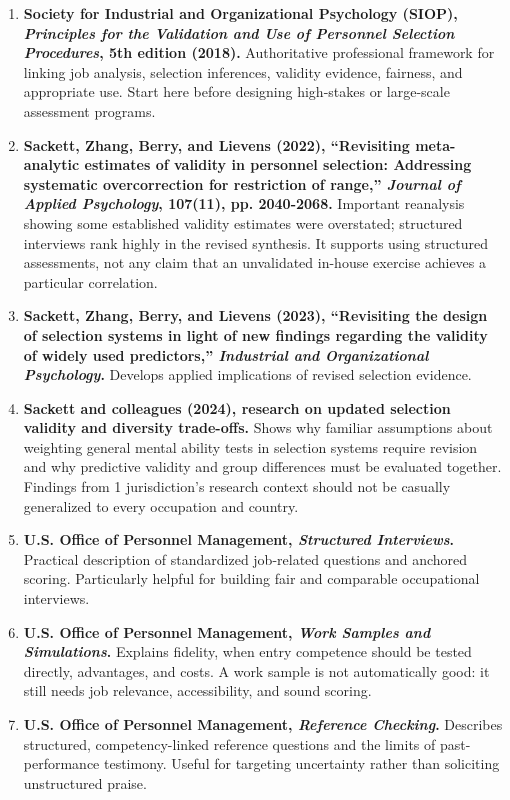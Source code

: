 \begin{enumerate}
    \item \textbf{Society for Industrial and Organizational Psychology (SIOP), \textit{Principles for the Validation and Use of Personnel Selection Procedures}, 5th edition (2018).} Authoritative professional framework for linking job analysis, selection inferences, validity evidence, fairness, and appropriate use. Start here before designing high-stakes or large-scale assessment programs.
    \item \textbf{Sackett, Zhang, Berry, and Lievens (2022), ``Revisiting meta-analytic estimates of validity in personnel selection: Addressing systematic overcorrection for restriction of range,'' \textit{Journal of Applied Psychology}, 107(11), pp. 2040-2068.} Important reanalysis showing some established validity estimates were overstated; structured interviews rank highly in the revised synthesis. It supports using structured assessments, not any claim that an unvalidated in-house exercise achieves a particular correlation.
    \item \textbf{Sackett, Zhang, Berry, and Lievens (2023), ``Revisiting the design of selection systems in light of new findings regarding the validity of widely used predictors,'' \textit{Industrial and Organizational Psychology}.} Develops applied implications of revised selection evidence.
    \item \textbf{Sackett and colleagues (2024), research on updated selection validity and diversity trade-offs.} Shows why familiar assumptions about weighting general mental ability tests in selection systems require revision and why predictive validity and group differences must be evaluated together. Findings from 1 jurisdiction's research context should not be casually generalized to every occupation and country.
    \item \textbf{U.S. Office of Personnel Management, \textit{Structured Interviews}.} Practical description of standardized job-related questions and anchored scoring. Particularly helpful for building fair and comparable occupational interviews.
    \item \textbf{U.S. Office of Personnel Management, \textit{Work Samples and Simulations}.} Explains fidelity, when entry competence should be tested directly, advantages, and costs. A work sample is not automatically good: it still needs job relevance, accessibility, and sound scoring.
    \item \textbf{U.S. Office of Personnel Management, \textit{Reference Checking}.} Describes structured, competency-linked reference questions and the limits of past-performance testimony. Useful for targeting uncertainty rather than soliciting unstructured praise.

\end{enumerate}
